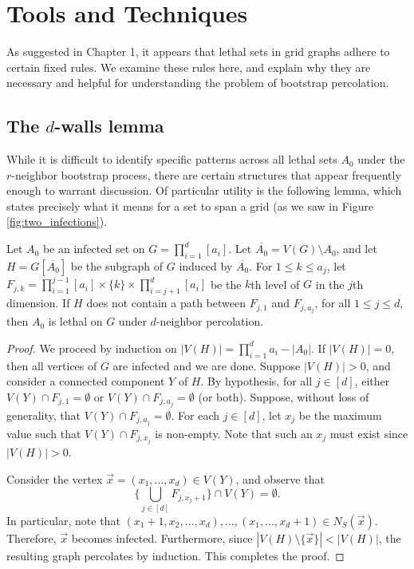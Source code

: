 \chapter{Tools and Techniques}

As suggested in Chapter 1, it appears that lethal sets in grid graphs adhere to certain fixed rules. We examine these rules here, and explain why they are necessary and helpful for understanding the problem of bootstrap percolation.

\section{The $d$-walls lemma}

While it is difficult to identify specific patterns across all lethal sets $A_0$ under the $r$-neighbor bootstrap process, there are certain structures that appear frequently enough to warrant discussion. Of particular utility is the following lemma, which states precisely what it means for a set to span a grid (as we saw in Figure \ref{fig:two_infections}).

\begin{lem}
\label{lem:walls}
Let $A_0$ be an infected set on $G = \prod_{i=1}^d [a_i]$. Let $\overline{A_0} = V(G) \setminus A_0$, and let $H = G[\overline{A_0}]$ be the subgraph of $G$ induced by $\overline{A_0}$. For $1 \leq k \leq a_j$, let $F_{j,k} = \prod_{i=1}^{j-1} [a_i] \times \{k\} \times \prod_{i=j+1}^{d} [a_i]$ be the $k$th level of $G$ in the $j$th dimension. If $H$ does not contain a path between $F_{j,1}$ and $F_{j,a_j}$, for all $1 \leq j \leq d$, then $A_0$ is lethal on $G$ under $d$-neighbor percolation.
\end{lem}

\begin{proof}
We proceed by induction on $|V(H)| = \prod_{i=1}^d a_i - |A_0|$. If $|V(H)| = 0$, then all vertices of $G$ are infected and we are done. Suppose $|V(H)| > 0$, and consider a connected component $Y$ of $H$. By hypothesis, for all $j \in [d]$, either $V(Y) \cap F_{j,1} = \emptyset$ or $V(Y) \cap F_{j,a_j} = \emptyset$ (or both). Suppose, without loss of generality, that $V(Y) \cap F_{j,a_j} = \emptyset$.
For each $j \in [d]$, let $x_j$ be the maximum value such that $V(Y) \cap F_{j,x_j}$ is non-empty. Note that such an $x_j$ must exist since $|V(H)| > 0$. 

Consider the vertex $\vec{x} = (x_1, \dots, x_d) \in V(Y)$, and observe that 
$$\{\bigcup_{j \in [d]} F_{j,x_j+1}\} \cap  V(Y) = \emptyset.$$
In particular, note that $(x_1+1, x_2, \dots, x_d), \dots, (x_1, \dots, x_d+1) \in N_S(\vec{x})$. Therefore, $\vec{x}$ becomes infected. Furthermore, since $|V(H) \setminus \{\vec{x}\}| < |V(H)|$, the resulting graph percolates by induction. This completes the proof.
\end{proof}

